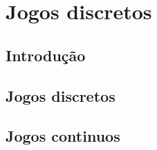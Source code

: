 \chapter{Jogos discretos}
\section{Introdução}
\section{Jogos discretos}
\section{Jogos continuos}

